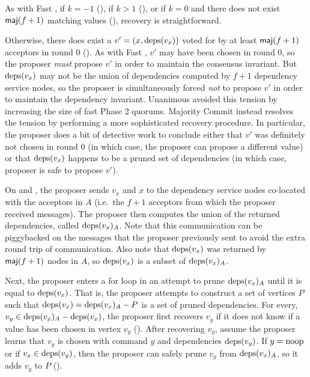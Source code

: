 As with Fast \BPaxos{}, if $k = -1$ (), if $k
> 1$ (), or if $k = 0$ and there does not exist
$\textsf{maj}(f+1)$ matching values (), recovery is
straightforward.

Otherwise, there does exist a $v' = (x, \text{deps}(v_x))$ voted for by at least
$\textsf{maj}(f+1)$ acceptors in round $0$ (). As with Fast
\BPaxos{}, $v'$ may have been chosen in round $0$, so the proposer \emph{must}
propose $v'$ in order to maintain the consensus invariant. But $\text{deps}(v_x)$ may
not be the union of dependencies computed by $f+1$ dependency service nodes, so
the proposer is simultaneously forced \emph{not} to propose $v'$ in order to
maintain the dependency invariant. Unanimous \BPaxos{} avoided this tension by
increasing the size of fast Phase 2 quorums.  Majority Commit \BPaxos{} instead
resolves the tension by performing a more sophisticated recovery procedure.  In
particular, the proposer does a bit of detective work to conclude either that
$v'$ was definitely not chosen in round $0$ (in which case, the proposer can
propose a different value) or that $\text{deps}(v_x)$ happens to be a pruned set of
dependencies (in which case, proposer is safe to propose $v'$).

On  and
, the proposer sends $v_x$ and $x$ to
the dependency service nodes co-located with the acceptors in $A$ (i.e.\ the
$f+1$ acceptors from which the proposer received  messages).
The proposer then computes the union of the returned dependencies, called
$\text{deps}(v_x)_A$. Note that this communication can be piggybacked on the
 messages that the proposer previously sent to avoid the extra
round trip of communication.
%
Also note that $\text{deps}(v_x)$ was returned by $\textsf{maj}(f+1)$ nodes in $A$, so
$\text{deps}(v_x)$ is a subset of $\text{deps}(v_x)_A$.

Next, the proposer enters a for loop in an attempt to prune $\text{deps}(v_x)_A$
until it is equal to $\text{deps}(v_x)$. That is, the proposer attempts to construct
a set of vertices $P$ such that $\text{deps}(v_x) = \text{deps}(v_x)_A - P$ is a set of
pruned dependencies. For every, $v_y \in \text{deps}(v_x)_A - \text{deps}(v_x)$, the
proposer first recovers $v_y$ if it does not know if a value has been chosen in
vertex $v_y$ (). After recovering $v_y$, assume the
proposer learns that $v_y$ is chosen with command $y$ and dependencies
$\text{deps}(v_y)$. If $y = \text{noop}$ or if $v_x \in \text{deps}(v_y)$, then the proposer can
safely prune $v_y$ from $\text{deps}(v_x)_A$, so it adds $v_y$ to $P$
().

